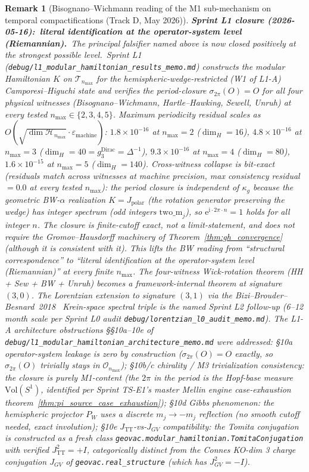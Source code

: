 \documentclass[11pt]{article}
\newtheorem{remark}{Remark}
\begin{document}
\begin{remark}[Bisognano--Wichmann reading of the M1 sub-mechanism on
temporal compactifications (Track D, May 2026)]
\textbf{Sprint L1 closure (2026-05-16):\ literal identification at the
operator-system level (Riemannian).}\ The principal falsifier named
above is now closed positively at the strongest possible level.\ Sprint
L1 (\texttt{debug/l1\_modular\_hamiltonian\_results\_memo.md}) constructs
the modular Hamiltonian $K$ on $\mathcal{T}_{n_{\max}}$ for the
hemispheric-wedge-restricted (W1 of L1-A) Camporesi--Higuchi state and
verifies the period-closure
$\sigma_{2\pi}(O) = O$ for all four physical witnesses
(Bisognano--Wichmann, Hartle--Hawking, Sewell, Unruh) at every tested
$n_{\max} \in \{2, 3, 4, 5\}$.  Maximum periodicity residual scales as
$O(\sqrt{\dim \mathcal{H}_{n_{\max}}} \cdot \varepsilon_{\mathrm{machine}})$:
$1.8 \times 10^{-16}$ at $n_{\max}=2$ ($\dim_H = 16$),
$4.8 \times 10^{-16}$ at $n_{\max}=3$ ($\dim_H = 40 = g_3^{\mathrm{Dirac}}
= \Delta^{-1}$),
$9.3 \times 10^{-16}$ at $n_{\max}=4$ ($\dim_H = 80$),
$1.6 \times 10^{-15}$ at $n_{\max}=5$ ($\dim_H = 140$).  Cross-witness
collapse is bit-exact (residuals match across witnesses at machine
precision, max consistency residual $= 0.0$ at every tested $n_{\max}$):
the period closure is independent of $\kappa_g$ because the
geometric BW-$\alpha$ realization $K = J_{\mathrm{polar}}$ (the rotation
generator preserving the wedge) has integer spectrum (odd integers
$\text{two\_m}_j$), so $\mathrm{e}^{\mathrm{i}\cdot 2\pi \cdot n} = 1$
holds for all integer $n$.  The closure is finite-cutoff exact, not a
limit-statement, and does not require the Gromov--Hausdorff machinery
of Theorem~\ref{thm:gh_convergence} (although it is consistent with it).
This lifts the BW reading from ``structural correspondence'' to
``literal identification at the operator-system level (Riemannian)''
at every finite $n_{\max}$.  The four-witness Wick-rotation theorem
(HH + Sew + BW + Unruh) becomes a framework-internal theorem at
signature $(3, 0)$.  The Lorentzian extension to signature $(3, 1)$
via the Bizi--Brouder--Besnard~2018~\cite{bizi_brouder_besnard2018}
Krein-space spectral triple is the named Sprint L2 follow-up
(6--12 month scale per Sprint L0 audit
\texttt{debug/lorentzian\_l0\_audit\_memo.md}).
The L1-A architecture obstructions
\S\S10a--10e of \texttt{debug/l1\_modular\_hamiltonian\_architecture\_memo.md}
were addressed: \S10a operator-system leakage is zero by construction
($\sigma_{2\pi}(O) = O$ exactly, so $\sigma_{2\pi}(O)$ trivially stays
in $\mathcal{O}_{n_{\max}}$); \S10b/c chirality / M3 trivialization
consistency: the closure is purely M1-content (the $2\pi$ in the
period is the Hopf-base measure
$\mathrm{Vol}(S^1)$, identified per Sprint TS-E1's master Mellin engine
case-exhaustion theorem~\ref{thm:pi_source_case_exhaustion}); \S10d
Gibbs phenomenon: the hemispheric projector $P_W$ uses a discrete
$m_j \to -m_j$ reflection (no smooth cutoff needed, exact involution);
\S10e $J_{\mathrm{TT}}$-vs-$J_{GV}$ compatibility: the Tomita conjugation
is constructed as a fresh class
\texttt{geovac.modular\_hamiltonian.TomitaConjugation} with verified
$J_{\mathrm{TT}}^2 = +I$, categorically distinct from the Connes
KO-dim 3 charge conjugation $J_{GV}$ of
\texttt{geovac.real\_structure} (which has $J_{GV}^2 = -I$).


\end{remark}
\end{document}
